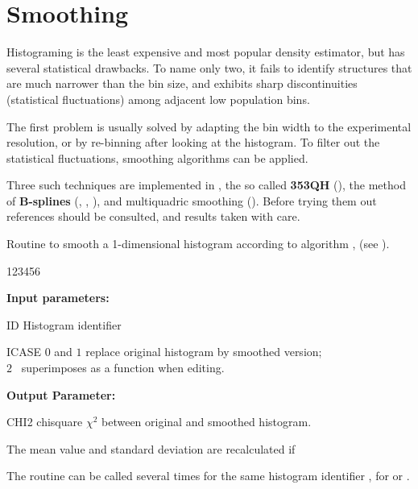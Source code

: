 \newpage%

\section{Smoothing}
\label{HSMOOTH}
 
Histograming is the least expensive and most popular density
estimator, but has several statistical drawbacks.
To name only two, it
fails to identify structures that are much narrower than the bin size,
and exhibits sharp discontinuities (statistical fluctuations) among
adjacent low population bins.
 
The first problem is usually solved by adapting the bin width to the
experimental resolution, or by re-binning after looking at the histogram.
To filter out the statistical fluctuations, smoothing algorithms can be
applied.
 
Three such techniques are implemented in , the so called
{\bf 353QH} (), the method of {\bf B-splines}%
(, , ), and multiquadric
smoothing ().
Before trying them out references 
%
should be consulted, and results taken with care.
 
 
\Action
Routine to smooth a 1-dimensional histogram according to algorithm ,
 (see \cite{bib-DATA}).
 
\begin{DLtt}{123456}
\item[{\rm\bf Input parameters:}]
\item[ID] Histogram identifier
\item[ICASE] $0$ and $1$ replace original histogram by smoothed version;\\
$2$ \ superimposes as a function when editing.
\item[{\rm\bf Output Parameter:}]
\item[CHI2] chisquare $\chi^2$ between original and smoothed histogram.
\end{DLtt}
 
\Remark
\begin{UL}
\item The mean value and standard deviation are recalculated if 
\item The routine can be called several times for the same histogram identifier
, for  or .
\end{UL}
 

